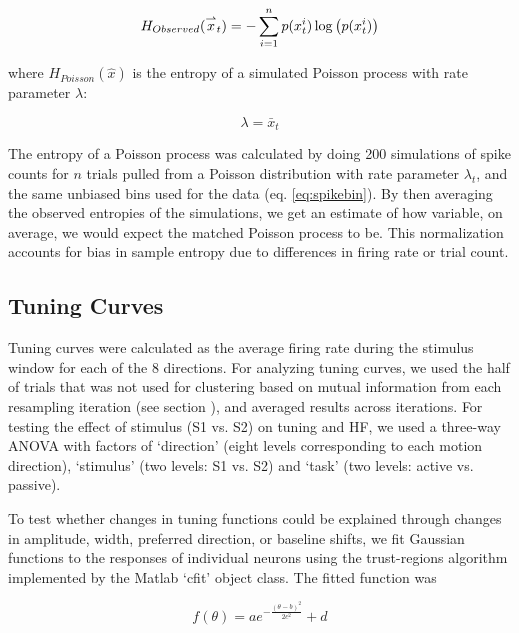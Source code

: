 \begin{equation}
	H_{Observed}(\overset{\rightharpoonup} x_t) = - \sum_{i=1}^n{p(x_t^i) \log\left(p(x_t^i)\right)}
\end{equation}

\noindent where $H_{Poisson}(\hat{x})$ is the entropy of a simulated Poisson process with rate parameter $\lambda$:

\begin{equation}
	\lambda = \bar{x}_t
\end{equation}

The entropy of a Poisson process was calculated by doing 200 simulations of spike counts for $n$ trials pulled from a Poisson distribution with rate parameter $\lambda _t$, and the same unbiased bins used for the data (eq. \ref{eq:spikebin}). By then averaging the observed entropies of the simulations, we get an estimate of how variable, on average, we would expect the matched Poisson process to be. This normalization accounts for bias in sample entropy due to differences in firing rate or trial count. 

\subsection*{Tuning Curves}\label{sec:tuning}
Tuning curves were calculated as the average firing rate during the stimulus window for each of the 8 directions. 
For analyzing tuning curves, we used the half of trials that was not used for clustering based on mutual information from each resampling iteration (see section \emph{}), and averaged results across iterations.\label{rev:xval2}
For testing the effect of stimulus (S1 vs. S2) on tuning and HF, we used a three-way ANOVA with factors of `direction' (eight levels corresponding to each motion direction), `stimulus' (two levels: S1 vs. S2) and `task' (two levels: active vs. passive).

To test whether changes in tuning functions could be explained through changes in amplitude, width, preferred direction, or baseline shifts, we fit Gaussian functions to the responses of individual neurons using the trust-regions algorithm implemented by the Matlab `cfit' object class.
The fitted function was

\begin{equation}
	f(\theta) = a e^{-\frac{(\theta-b)^2}{2c^2}} + d
\end{equation}

